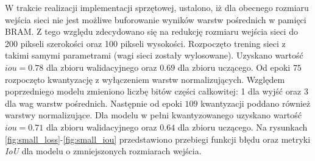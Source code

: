 W trakcie realizacji implementacji sprzętowej, ustalono, iż dla obecnego rozmiaru wejścia sieci nie jest możliwe buforowanie wyników warstw pośrednich w pamięci BRAM.
Z tego względu zdecydowano się na redukcję rozmiaru wejścia sieci do 200 pikseli szerokości oraz 100 pikseli wysokości. 
Rozpoczęto trening sieci z takimi samymi parametrami (wagi sieci zostały wylosowane).  
Uzyskano wartość $iou = 0.78$ dla zbioru walidacyjnego oraz $0.69$ dla zbioru uczącego.
Od epoki $75$ rozpoczęto kwantyzację z wyłączeniem warstw normalizujących.
Względem poprzedniego modelu zmieniono liczbę bitów części całkowitej: 1 dla wyjść oraz 3 dla wag warstw pośrednich.
Następnie od epoki $109$ kwantyzacji poddano również warstwy normalizujące.
Dla modelu w pełni kwantyzowanego uzyskano wartość $iou = 0.71$ dla zbioru walidacyjnego oraz $0.64$ dla zbioru uczącego. Na rysunkach \ref{fig:small_loss}-\ref{fig:small_iou} przedstawiono przebiegi funkcji błędu oraz metryki \emph{IoU} dla modelu o zmniejszonych rozmiarach wejścia. 

